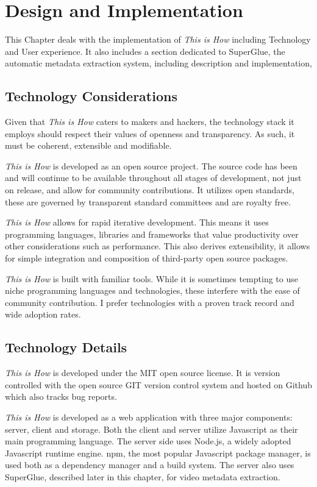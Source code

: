 \chapter{Design and Implementation}
\label{chap_impl}

This Chapter deals with the implementation of \textit{This is How} including Technology and User experience. It also includes a section dedicated to SuperGlue, the automatic metadata extraction system, including description and implementation, 

\section{Technology Considerations}

Given that \textit{This is How} caters to makers and hackers, the technology stack it employs should respect their values of openness and transparency. As such, it must be coherent, extensible and modifiable.
 
\textit{This is How} is developed as an open source project. The source code has been and will continue to be available throughout all stages of development, not just on release, and allow for community contributions. It utilizes open standards, these are governed by transparent standard committees and are royalty free. 

\textit{This is How} allows for rapid iterative development. This means it uses programming languages, libraries and frameworks that value productivity over other considerations such as performance. This also derives extensibility, it allows for simple integration and composition of third-party open source packages. 

\textit{This is How} is built with familiar tools. While it is sometimes tempting to use niche programming languages and technologies, these interfere with the ease of community contribution. I prefer technologies with a proven track record and wide adoption rates.

\section{Technology Details}

\textit{This is How} is developed under the MIT open source license. It is version controlled with the open source GIT\cite{git} version control system and hosted on Github\cite{github} which also tracks bug reports. 

\textit{This is How} is developed as a web application with three major components: server, client and storage. Both the client and server utilize Javascript as their main programming language. The server side uses Node.js, a widely adopted Javascript runtime engine. npm\cite{npm}, the most popular Javascript package manager, is used both as a dependency manager and a build system. The server also uses SuperGlue, described later in this chapter, for video metadata extraction.

